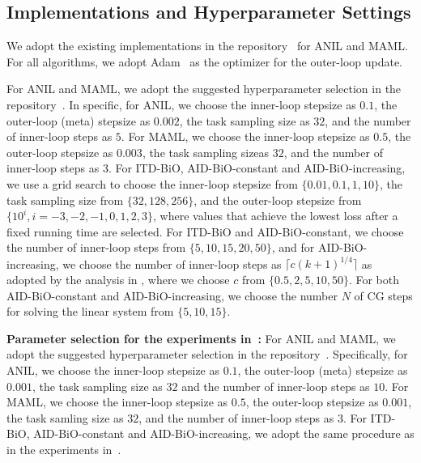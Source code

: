 \documentclass{osudissert96}
\begin{document}
\subsection*{Implementations and Hyperparameter Settings}
We adopt the existing implementations in the repository~\cite{learn2learn2019} for ANIL and MAML. 
 For all algorithms, we adopt Adam~\cite{kingma2014adam} as the optimizer for the outer-loop update. 
 
\vspace{0.2cm}
 For ANIL and MAML, we adopt the suggested hyperparameter selection in the repository~\cite{learn2learn2019}. In specific, for ANIL, we choose the inner-loop stepsize as $0.1$, the outer-loop (meta) stepsize as $0.002$, the task sampling size as $32$, and the number of inner-loop steps as $5$. For MAML, we choose the inner-loop stepsize as $0.5$, the outer-loop stepsize as $0.003$, the task sampling sizeas $32$, and the number of inner-loop steps as $3$. 
For ITD-BiO, AID-BiO-constant and AID-BiO-increasing, we use a grid search to choose the inner-loop stepsize from $\{0.01,0.1,1,10\}$, the task sampling size from $\{32,128,256\}$, and  the  outer-loop stepsize from $\{10^{i},i=-3,-2,-1,0,1,2,3\}$, where values that achieve the lowest loss after a fixed running time are selected.  
 For ITD-BiO and AID-BiO-constant, we choose the  number of inner-loop steps from $\{5,10,15,20,50\}$, and for AID-BiO-increasing, we choose the number of inner-loop steps as $\lceil c{(k+1)}^{1/4}\rceil$ as adopted by the analysis in \cite{ghadimi2018approximation}, where we choose $c$ from $\{0.5,2,5,10,50\}$.
For both AID-BiO-constant and AID-BiO-increasing, we choose the number $N$ of CG steps for solving the linear system from $\{5,10,15\}$.



\vspace{0.2cm}
\noindent 
{\bf Parameter selection for the experiments in~:}  For ANIL and MAML, we adopt the suggested hyperparameter selection in the repository~\cite{learn2learn2019}. Specifically, for ANIL, we choose the inner-loop stepsize as $0.1$, the outer-loop (meta) stepsize as $0.001$, the task sampling size as $32$ and the number of inner-loop steps as $10$. For MAML, we choose the inner-loop stepsize as $0.5$, the outer-loop stepsize as $0.001$,  the  task samling size as $32$, and the number of inner-loop steps as $3$. For ITD-BiO, AID-BiO-constant and AID-BiO-increasing, we adopt the same procedure as in the experiments in~. 
\end{document}
